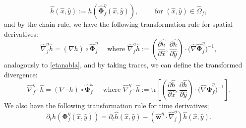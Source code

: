 \documentclass[11pt]{article}
\newcommand{\bd}{\boldsymbol}
\theoremstyle{definition}
\begin{document}
\begin{equation}\label{hatfluid}
\hat{h}(\hat{x}, \hat{y}) := h(\hat{\bd{\Phi}}^{\eta}_{f}(\hat{x}, \hat{y})), \qquad \text{ for } (\hat{x}, \hat{y}) \in \hat{\Omega}_{f},
\end{equation}
and by the chain rule, we have the following transformation rule for spatial derivatives:
\begin{equation}\label{gradtransform}
\hat{\nabla}^{\eta}_{f} \hat{h} = (\nabla h) \circ \hat{\bd{\Phi}}^{\eta}_{f} \quad \text{ where } \hat{\nabla}^{\eta}_{f} \hat{h} := \left(\frac{\partial \hat{h}}{\partial \hat{x}}, \frac{\partial \hat{h}}{\partial \hat{y}}\right) \cdot \Big(\hat{\nabla} \hat{\bd{\Phi}}^{\eta}_{f}\Big)^{-1},
\end{equation}
analogously to \eqref{etanabla}, and by taking traces, we can define the transformed divergence:
\begin{equation}\label{transformdiv}
\hat{\nabla}^{\eta}_{f} \cdot \hat{h} = (\nabla \cdot h) \circ \hat{\bd{\Phi}}^{\omega}_{f} \quad \text{ where } \hat{\nabla}^{\eta}_{f} \cdot \hat{h} := \text{tr}\left[\left(\frac{\partial \hat{h}}{\partial \hat{x}}, \frac{\partial \hat{h}}{\partial \hat{y}}\right) \cdot \Big(\hat{\nabla} \hat{\bd{\Phi}}^{\eta}_{f}\Big)^{-1}\right].
\end{equation}
We also have the following transformation rule for time derivatives;
\begin{equation}\label{aletime}
\partial_{t} h(\bd{\Phi}^{\eta}_{f}(\hat{x}, \hat{y})) = \partial_{t}\hat{h}(\hat{x}, \hat{y}) - (\hat{\bd{w}}^{\eta} \cdot \hat{\nabla}^{\eta}_{f}) \hat{h}(\hat{x}, \hat{y}).
\end{equation}
\end{document}
